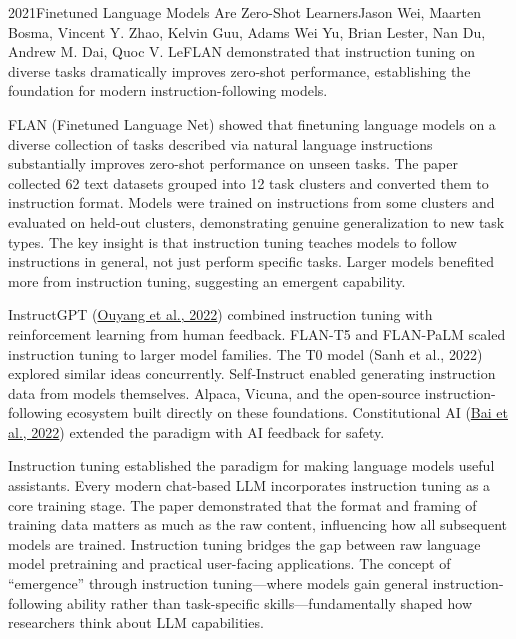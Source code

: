 
\begin{papersummary}{2021}{Finetuned Language Models Are Zero-Shot Learners}{Jason Wei, Maarten Bosma, Vincent Y. Zhao, Kelvin Guu, Adams Wei Yu, Brian Lester, Nan Du, Andrew M. Dai, Quoc V. Le}{FLAN demonstrated that instruction tuning on diverse tasks dramatically improves zero-shot performance, establishing the foundation for modern instruction-following models.}

FLAN (Finetuned Language Net) showed that finetuning language models on a diverse collection of tasks described via natural language instructions substantially improves zero-shot performance on unseen tasks. The paper collected 62 text datasets grouped into 12 task clusters and converted them to instruction format. Models were trained on instructions from some clusters and evaluated on held-out clusters, demonstrating genuine generalization to new task types. The key insight is that instruction tuning teaches models to follow instructions in general, not just perform specific tasks. Larger models benefited more from instruction tuning, suggesting an emergent capability.

InstructGPT (\hyperref[paper:ouyang-2022]{Ouyang et al., 2022}) combined instruction tuning with reinforcement learning from human feedback. FLAN-T5 and FLAN-PaLM scaled instruction tuning to larger model families. The T0 model (Sanh et al., 2022) explored similar ideas concurrently. Self-Instruct enabled generating instruction data from models themselves. Alpaca, Vicuna, and the open-source instruction-following ecosystem built directly on these foundations. Constitutional AI (\hyperref[paper:bai-2022]{Bai et al., 2022}) extended the paradigm with AI feedback for safety.

Instruction tuning established the paradigm for making language models useful assistants. Every modern chat-based LLM incorporates instruction tuning as a core training stage. The paper demonstrated that the format and framing of training data matters as much as the raw content, influencing how all subsequent models are trained. Instruction tuning bridges the gap between raw language model pretraining and practical user-facing applications. The concept of ``emergence'' through instruction tuning---where models gain general instruction-following ability rather than task-specific skills---fundamentally shaped how researchers think about LLM capabilities.

\end{papersummary}
